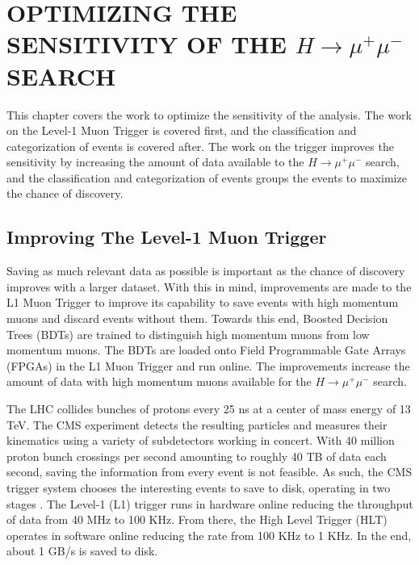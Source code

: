 \chapter{OPTIMIZING THE SENSITIVITY OF THE $H\rightarrow\mu^+\mu^-$ SEARCH} \label{optimize}

This chapter covers the work to optimize the sensitivity of the analysis. The work on the Level-1 Muon Trigger is covered first, and the classification and categorization of events is covered after. The work on the trigger improves the sensitivity by increasing the amount of data available to the $H\rightarrow\mu^+\mu^-$ search, and the classification and categorization of events groups the events to maximize the chance of discovery.  

\section{Improving The Level-1 Muon Trigger}

Saving as much relevant data as possible is important as the chance of discovery improves with a larger dataset. With this in mind, improvements are made to the L1 Muon Trigger to improve its capability to save events with high momentum muons and discard events without them. Towards this end, Boosted Decision Trees (BDTs) are trained to distinguish high momentum muons from low momentum muons. The BDTs are loaded onto Field Programmable Gate Arrays (FPGAs) in the L1 Muon Trigger and run online. The improvements increase the amount of data with high momentum muons available for the $H\rightarrow \mu^+\mu^-$ search. 

The LHC collides bunches of protons every 25 ns at a center of mass energy of 13 TeV. The CMS experiment detects the resulting particles and measures their kinematics using a variety of subdetectors working in concert. With 40 million proton bunch crossings per second amounting to roughly 40 TB of data each second, saving the information from every event is not feasible. As such, the CMS trigger system chooses the interesting events to save to disk, operating in two stages \cite{Khachatryan:2016bia}. The Level-1 (L1) trigger runs in hardware online reducing the throughput of data from 40 MHz to 100 KHz. From there, the High Level Trigger (HLT) operates in software online reducing the rate from 100 KHz to 1 KHz. In the end, about 1 GB/s is saved to disk.

